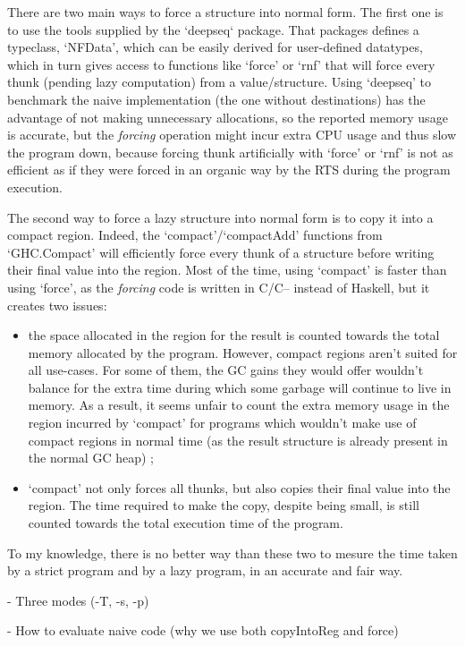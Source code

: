 \documentclass[english]{jflart}
\begin{document}
There are two main ways to force a structure into normal form. The first one is to use the tools supplied by the `deepseq` package. That packages defines a typeclass, `NFData', which can be easily derived for user-defined datatypes, which in turn gives access to functions like `force' or `rnf' that will force every thunk (pending lazy computation) from a value/structure. Using `deepseq' to benchmark the naive implementation (the one without destinations) has the advantage of not making unnecessary allocations, so the reported memory usage is accurate, but the \emph{forcing} operation might incur extra CPU usage and thus slow the program down, because forcing thunk artificially with `force' or `rnf' is not as efficient as if they were forced in an organic way by the RTS during the program execution.

The second way to force a lazy structure into normal form is to copy it into a compact region. Indeed, the `compact'/`compactAdd' functions from `GHC.Compact' will efficiently force every thunk of a structure before writing their final value into the region. Most of the time, using `compact' is faster than using `force', as the  \emph{forcing} code is written in C/C-- instead of Haskell, but it creates two issues:

\begin{itemize}
  \item the space allocated in the region for the result is counted towards the total memory allocated by the program. However, compact regions aren't suited for all use-cases. For some of them, the GC gains they would offer wouldn't balance for the extra time during which some garbage will continue to live in memory. As a result, it seems unfair to count the extra memory usage in the region incurred by `compact' for programs which wouldn't make use of compact regions in normal time (as the result structure is already present in the normal GC heap) ;
  \item `compact' not only forces all thunks, but also copies their final value into the region. The time required to make the copy, despite being small, is still counted towards the total execution time of the program.
\end{itemize}

To my knowledge, there is no better way than these two to mesure the time taken by a strict program and by a lazy program, in an accurate and fair way.

- Three modes (-T, -s, -p)

- How to evaluate naive code (why we use both copyIntoReg and force)
\end{document}
